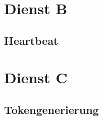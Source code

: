 \section{Dienst B}
\label{sec:Nachrichten:DienstB}

\subsection*{Heartbeat}
\label{subsec:Nachrichten:DienstB:HeartBeat}





\section{Dienst C}
\label{sec:Nachrichten:DienstC}

\subsection*{Tokengenerierung}
\label{subsec:Nachrichten:DienstC:Tokengenerierung}




